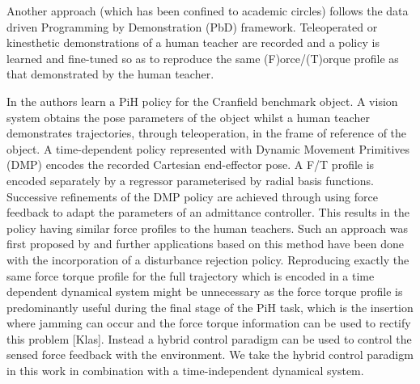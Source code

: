 

Another approach (which has been confined to academic circles) follows the data driven 
Programming by Demonstration (PbD) framework. Teleoperated or kinesthetic demonstrations of a human teacher 
are recorded and a policy is learned and fine-tuned so as to reproduce the same (F)orce/(T)orque profile as 
that demonstrated by the human teacher. 

In \cite{fast_peg_pbd_icmc_2014} the authors learn a PiH policy for the Cranfield benchmark object.
A vision system obtains the pose parameters of the object whilst a human teacher  
demonstrates trajectories, through teleoperation, in the frame of reference of the object. 
A time-dependent policy represented with Dynamic Movement Primitives (DMP) \cite{Schaal04learningmovement} 
encodes the recorded Cartesian end-effector pose. A F/T profile is encoded separately by a regressor parameterised 
by radial basis functions. Successive refinements of the DMP policy are achieved through 
using force feedback to adapt the parameters of an admittance controller. This results in the policy having
similar force profiles to the human teachers. Such an approach was first proposed by \cite{trans_workpiece_icra_2013}
and further applications based on this method have been done \cite{sol_pdg_pbd_2014} with the incorporation of  
a disturbance rejection policy. Reproducing exactly the same force torque profile for the full trajectory 
which is encoded in a time dependent dynamical system might be unnecessary as the force torque profile is 
predominantly useful during the final stage of the PiH task, which is the insertion where jamming can occur 
and the force torque information can be used to rectify this problem [Klas]. Instead a 
hybrid control paradigm \cite{hybrid_1992} can be used to control the sensed force feedback with the environment.
We take the hybrid control paradigm in this work in combination with a time-independent dynamical system.

